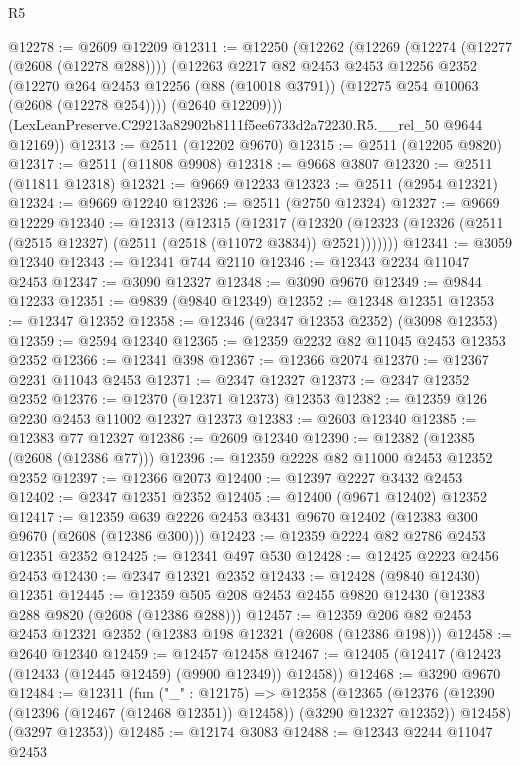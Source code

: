 \begin{lexlean}{R5}
\begin{coremodule}
@12278 := @2609 @12209
@12311 := @12250
    (@12262
      (@12269
        (@12274 (@12277 (@2608 (@12278 @288))))
        (@12263
          @2217
          @82
          @2453
          @2453
          @12256
          @2352
          (@12270 @264 @2453 @12256 (@88 (@10018 @3791)) (@12275 @254 @10063 (@2608 (@12278 @254))))
          (@2640 @12209)))
      (LexLeanPreserve.C29213a82902b8111f5ee6733d2a72230.R5.__rel_50 @9644 @12169))
@12313 := @2511 (@12202 @9670)
@12315 := @2511 (@12205 @9820)
@12317 := @2511 (@11808 @9908)
@12318 := @9668 @3807
@12320 := @2511 (@11811 @12318)
@12321 := @9669 @12233
@12323 := @2511 (@2954 @12321)
@12324 := @9669 @12240
@12326 := @2511 (@2750 @12324)
@12327 := @9669 @12229
@12340 := @12313
    (@12315
      (@12317
        (@12320 (@12323 (@12326 (@2511 (@2515 @12327) (@2511 (@2518 (@11072 @3834)) @2521)))))))
@12341 := @3059 @12340
@12343 := @12341 @744 @2110
@12346 := @12343 @2234 @11047 @2453
@12347 := @3090 @12327
@12348 := @3090 @9670
@12349 := @9844 @12233
@12351 := @9839 (@9840 @12349)
@12352 := @12348 @12351
@12353 := @12347 @12352
@12358 := @12346 (@2347 @12353 @2352) (@3098 @12353)
@12359 := @2594 @12340
@12365 := @12359 @2232 @82 @11045 @2453 @12353 @2352
@12366 := @12341 @398
@12367 := @12366 @2074
@12370 := @12367 @2231 @11043 @2453
@12371 := @2347 @12327
@12373 := @2347 @12352 @2352
@12376 := @12370 (@12371 @12373) @12353
@12382 := @12359 @126 @2230 @2453 @11002 @12327 @12373
@12383 := @2603 @12340
@12385 := @12383 @77 @12327
@12386 := @2609 @12340
@12390 := @12382 (@12385 (@2608 (@12386 @77)))
@12396 := @12359 @2228 @82 @11000 @2453 @12352 @2352
@12397 := @12366 @2073
@12400 := @12397 @2227 @3432 @2453
@12402 := @2347 @12351 @2352
@12405 := @12400 (@9671 @12402) @12352
@12417 := @12359 @639 @2226 @2453 @3431 @9670 @12402 (@12383 @300 @9670 (@2608 (@12386 @300)))
@12423 := @12359 @2224 @82 @2786 @2453 @12351 @2352
@12425 := @12341 @497 @530
@12428 := @12425 @2223 @2456 @2453
@12430 := @2347 @12321 @2352
@12433 := @12428 (@9840 @12430) @12351
@12445 := @12359 @505 @208 @2453 @2455 @9820 @12430 (@12383 @288 @9820 (@2608 (@12386 @288)))
@12457 := @12359 @206 @82 @2453 @2453 @12321 @2352 (@12383 @198 @12321 (@2608 (@12386 @198)))
@12458 := @2640 @12340
@12459 := @12457 @12458
@12467 := @12405 (@12417 (@12423 (@12433 (@12445 @12459) (@9900 @12349)) @12458))
@12468 := @3290 @9670
@12484 := @12311
    (fun ("_" : @12175) =>
    @12358
      (@12365
        (@12376 (@12390 (@12396 (@12467 (@12468 @12351)) @12458)) (@3290 @12327 @12352))
        @12458)
      (@3297 @12353))
@12485 := @12174 @3083
@12488 := @12343 @2244 @11047 @2453

\end{coremodule}
\end{lexlean}
